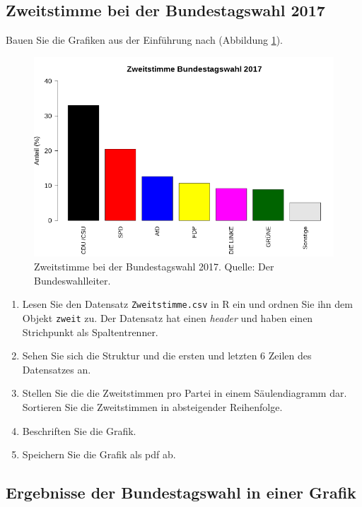 \documentclass[]{book}
\providecommand{\tightlist}{%
  \setlength{\itemsep}{0pt}\setlength{\parskip}{0pt}}
\begin{document}
\hypertarget{zweitstimme}{%
\subsection{Zweitstimme bei der Bundestagswahl 2017}\label{zweitstimme}}

Bauen Sie die Grafiken aus der Einführung nach (Abbildung \ref{fig:zweitstimme}).

\begin{figure}
\includegraphics[width=1\linewidth]{Zweitstimme} \caption{Zweitstimme bei der Bundestagswahl 2017. Quelle: Der Bundeswahlleiter.}\label{fig:zweitstimme}
\end{figure}

\begin{enumerate}
\def\labelenumi{\arabic{enumi}.}
\tightlist
\item
  Lesen Sie den Datensatz \texttt{Zweitstimme.csv} in R ein und ordnen Sie ihn dem Objekt \texttt{zweit} zu. Der Datensatz hat einen \emph{header} und haben einen Strichpunkt als Spaltentrenner.
\item
  Sehen Sie sich die Struktur und die ersten und letzten 6 Zeilen des Datensatzes an.
\item
  Stellen Sie die die Zweitstimmen pro Partei in einem Säulendiagramm dar. Sortieren Sie die Zweitstimmen in absteigender Reihenfolge.
\item
  Beschriften Sie die Grafik.
\item
  Speichern Sie die Grafik als pdf ab.
\end{enumerate}

\hypertarget{zweigrafiken}{%
\subsection{Ergebnisse der Bundestagswahl in einer Grafik}\label{zweigrafiken}}
\end{document}
